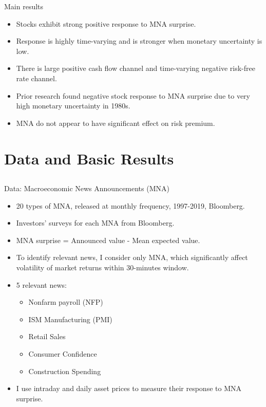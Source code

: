 \documentclass{beamer}
\begin{document}
\begin{frame}{Main results}
\begin{itemize}
    \item {Stocks exhibit strong positive response to MNA surprise.}    
    \item {Response is highly time-varying and is stronger when monetary uncertainty is low.}    
    \item {There is large positive cash flow channel and time-varying negative risk-free rate channel.}
    \item {Prior research found negative stock response to MNA surprise due to very high monetary uncertainty in 1980s.}
    \item {MNA do not appear to have significant effect on risk premium.}
    \begin{itemize}
    \end{itemize}
\end{itemize}
\end{frame}

\section{Data and Basic Results}
\subsection{}



\begin{frame}{Data: Macroeconomic News Announcements (MNA)}
\begin{itemize}
    \item {20 types of MNA, released at monthly frequency, 1997-2019, Bloomberg.}
    \item {Investors' surveys for each MNA from Bloomberg.}
    \item {MNA surprise = Announced value - Mean expected value.}
    \item {To identify relevant news, I consider only MNA, which significantly affect volatility of market returns within 30-minutes window.}
    \item {5 relevant news:}
    \begin{itemize}
    \footnotesize
        \item {Nonfarm payroll (NFP)}
        \item {ISM Manufacturing (PMI)}
        \item {Retail Sales}
        \item {Consumer Confidence}
        \item {Construction Spending}
    \end{itemize}
    \item {I use intraday and daily asset prices to measure their response to MNA surprise.}
\end{itemize}
\end{frame}
\end{document}
